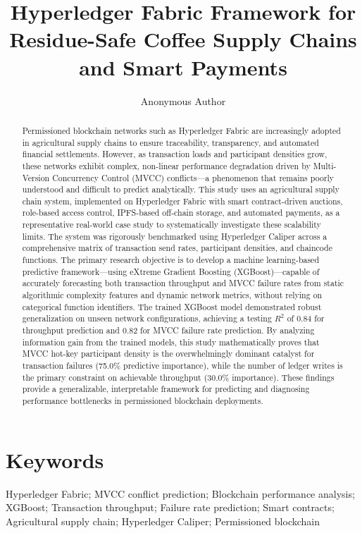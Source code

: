 \documentclass[manuscript,screen]{acmart}
\title{Hyperledger Fabric Framework for Residue-Safe Coffee Supply Chains and Smart Payments}
\author{Anonymous Author}
\affiliation{%
	\institution{Anonymous Institution}
	\city{Anonymous City}
	\state{Anonymous State}
	\country{Anonymous Country}
}
\begin{document}
	
	\maketitle
		\begin{abstract}
		Permissioned blockchain networks such as Hyperledger Fabric are increasingly adopted in agricultural supply chains to ensure traceability, transparency, and automated financial settlements. However, as transaction loads and participant densities grow, these networks exhibit complex, non-linear performance degradation driven by Multi-Version Concurrency Control (MVCC) conflicts—a phenomenon that remains poorly understood and difficult to predict analytically. This study uses an agricultural supply chain system, implemented on Hyperledger Fabric with smart contract-driven auctions, role-based access control, IPFS-based off-chain storage, and automated payments, as a representative real-world case study to systematically investigate these scalability limits. The system was rigorously benchmarked using Hyperledger Caliper across a comprehensive matrix of transaction send rates, participant densities, and chaincode functions. The primary research objective is to develop a machine learning-based predictive framework—using eXtreme Gradient Boosting (XGBoost)—capable of accurately forecasting both transaction throughput and MVCC failure rates from static algorithmic complexity features and dynamic network metrics, without relying on categorical function identifiers. The trained XGBoost model demonstrated robust generalization on unseen network configurations, achieving a testing $R^2$ of 0.84 for throughput prediction and 0.82 for MVCC failure rate prediction. By analyzing information gain from the trained models, this study mathematically proves that MVCC hot-key participant density is the overwhelmingly dominant catalyst for transaction failures (75.0\% predictive importance), while the number of ledger writes is the primary constraint on achievable throughput (30.0\% importance). These findings provide a generalizable, interpretable framework for predicting and diagnosing performance bottlenecks in permissioned blockchain deployments.
	\end{abstract}
	
	
	
	
	
	\section*{Keywords}
	Hyperledger Fabric; MVCC conflict prediction; Blockchain performance analysis; 
	XGBoost; Transaction throughput; Failure rate prediction; Smart contracts; 
	Agricultural supply chain; Hyperledger Caliper; Permissioned blockchain
	
\end{document}
